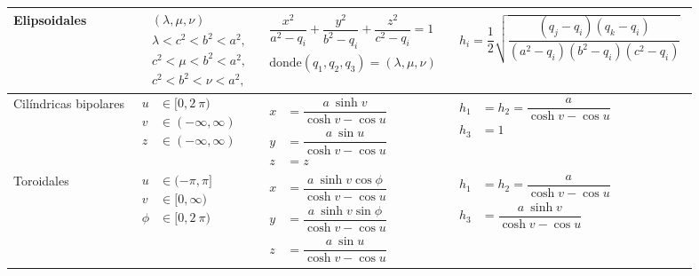 \documentclass[12pt,landscape]{article}
\numberwithin{equation}{section}
\begin{document}
{\begin{longtable}{| l | p{5cm} | l | p{7.3cm} |}
Elipsoidales & $\!\begin{aligned}
& (\lambda, \mu, \nu) \\
& \lambda < c^{2} < b^{2} < a^{2}, \\
& c^{2} < \mu < b^{2} < a^{2}, \\
& c^{2} < b^{2} < \nu < a^{2},
\end{aligned}$ & $\!\begin{aligned}
\dfrac{x^{2}}{a^{2} - q_{i}} + \dfrac{y^{2}}{b^{2} - q_{i}} + \dfrac{z^{2}}{c^{2} - q_{i}} = 1 \\[1em]
\mbox{donde} (q_{1}, q_{2}, q_{3})= (\lambda, \mu, \nu)
\end{aligned}$ & $\!\begin{aligned}
h_{i} = \dfrac{1}{2} \sqrt{\dfrac{(q_{j} - q_{i})(q_{k} - q_{i})}{(a^{2} - q_{i})(b^{2} - q_{i})(c^{2} - q_{i})}}
\end{aligned}$ \\ \hline

Cilíndricas bipolares & $\!\begin{aligned}
u &\in [0, 2 \: \pi) \\
v &\in (-\infty, \infty) \\
z &\in (-\infty, \infty)
\end{aligned}$ & $\!\begin{aligned}
x &= \dfrac{a \: \sinh v}{\cosh v - \cos u} \\
y &= \dfrac{a \: \sin u}{\cosh v - \cos u} \\
z &= z
\end{aligned}$ & $\!\begin{aligned}
h_{1} &= h_{2} = \dfrac{a}{\cosh v - \cos u} \\
h_{3} &= 1
\end{aligned}$ \\ \hline

Toroidales & $\!\begin{aligned}
u &\in (-\pi, \pi] \\
v &\in [0, \infty) \\
\phi &\in [0, 2 \: \pi)
\end{aligned}$ & $\!\begin{aligned}
x &= \dfrac{a \: \sinh v \cos \phi}{\cosh v - \cos u} \\
y &= \dfrac{a \: \sinh v \sin \phi}{\cosh v - \cos u} \\
z &= \dfrac{a \: \sin u}{\cosh v - \cos u}
\end{aligned}$ & $\!\begin{aligned}
h_{1} &= h_{2} = \dfrac{a}{\cosh v - \cos u} \\
h_{3} &= \dfrac{a \: \sinh v}{\cosh v - \cos u}
\end{aligned}$ \\ \hline


\end{longtable}}
\end{document}
